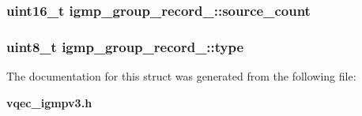 \subsubsection{\setlength{\rightskip}{0pt plus 5cm}uint16\_\-t \bf{igmp\_\-group\_\-record\_\-::source\_\-count}}\label{structigmp__group__record___84ef85db004563112d3396c37bf57284}


\subsubsection{\setlength{\rightskip}{0pt plus 5cm}uint8\_\-t \bf{igmp\_\-group\_\-record\_\-::type}}\label{structigmp__group__record___e78896a2702d15ddcc512c86090fba25}




The documentation for this struct was generated from the following file:\begin{CompactItemize}
\item 
\bf{vqec\_\-igmpv3.h}\end{CompactItemize}
